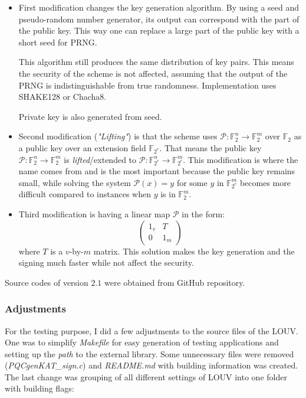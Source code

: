 \documentclass[thesis=M,english]{FITthesis}[2019/12/23]
\begin{document}
\begin{itemize}
\item	First modification changes the key generation algorithm. By using a seed and pseudo-random number generator, its output can correspond with the part of the public key. This way one can replace a large part of the public key with a short seed for PRNG.

This algorithm still produces the same distribution of key pairs. This means the security of the scheme is not affected, assuming that the output of the PRNG is indistinguishable from true randomness. Implementation uses SHAKE128 or Chacha8.

Private key is also generated from seed.

\item	Second modification (\textit{"Lifting"}) is that the scheme uses $\mathcal{P}:\mathbb{F}_2^n \rightarrow \mathbb{F}_2^m$ over $\mathbb{F}_2$ as a public key over an extension field $\mathbb{F}_{2^r}$. That means the public key $\mathcal{P}:\mathbb{F}_2^n \rightarrow \mathbb{F}_2^m$ is \textit{lifted}/extended to $\mathcal{P}:\mathbb{F}_{2^r}^n \rightarrow \mathbb{F}_{2^r}^m$. This modification is where the name comes from and is the most important because the public key remains small, while solving the system $\mathcal{P}(x) = y$ for some $y$ in $\mathbb{F}_{2^r}^m$ becomes more difficult compared to instances when $y$ is in $\mathbb{F}_{2}^m$.\cite{L-LIFTING}

\item	Third modification is having a linear map $\mathcal{P}$ in the form:
\begin{equation*}
\begin{pmatrix}
1_v & T\\
0 & 1_m
\end{pmatrix}
\end{equation*}
where $T$ is a $v$-by-$m$ matrix. This solution makes the key generation and the signing much faster\cite{L-CZYP} while not affect the security.\cite{L-EQ-KEYS}
\end{itemize}

Source codes of version $2.1$ were obtained from GitHub repository.

\subsubsection{Adjustments}
For the testing purpose, I did a few adjustments to the source files of the LOUV. One was to simplify \textit{Makefile} for easy generation of testing applications and setting up the \textit{path} to the external library. Some unnecessary files were removed (\textit{PQCgenKAT\_sign.c}) and \textit{README.md} with building information was created. The last change was grouping of all different settings of LOUV into one folder with building flags:
\end{document}
